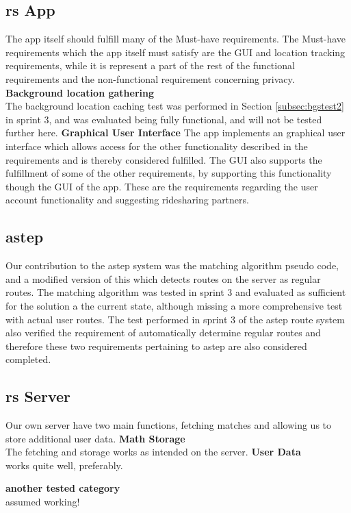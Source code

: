 \subsection{\gls{rs} App}
The app itself should fulfill many of the Must-have requirements.
The Must-have requirements which the app itself must satisfy are the GUI and location tracking requirements, while it is represent a part of the rest of the functional requirements and the non-functional requirement concerning privacy.
\textbf{Background location gathering}\\
The background location caching test was performed in Section \ref{subsec:bgstest2} in sprint 3, and was evaluated being fully functional, and will not be tested further here.
\textbf{Graphical User Interface}
The app implements an graphical user interface which allows access for the other functionality described in the requirements and is thereby considered fulfilled.
The GUI also supports the fulfillment of some of the other requirements, by supporting this functionality though the GUI of the app.
These are the requirements regarding the user account functionality and suggesting ridesharing partners.

\subsection{\gls{astep}}
Our contribution to the \gls{astep} system was the matching algorithm pseudo code, and a modified version of this which detects routes on the server as regular routes.
The matching algorithm was tested in sprint 3 and evaluated as sufficient for the solution a the current state, although missing a more comprehensive test with actual user routes.
The test performed in sprint 3 of the \gls{astep} route system also verified the requirement of automatically determine regular routes and therefore these two requirements pertaining to \gls{astep} are also considered completed.

\subsection{\gls{rs} Server}
Our own server have two main functions, fetching matches and allowing us to store additional user data.
\textbf{Math Storage}\\
The fetching and storage works as intended on the server. 
\textbf{User Data}\\
works quite well, preferably.

\textbf{another tested category}\\
assumed working!


